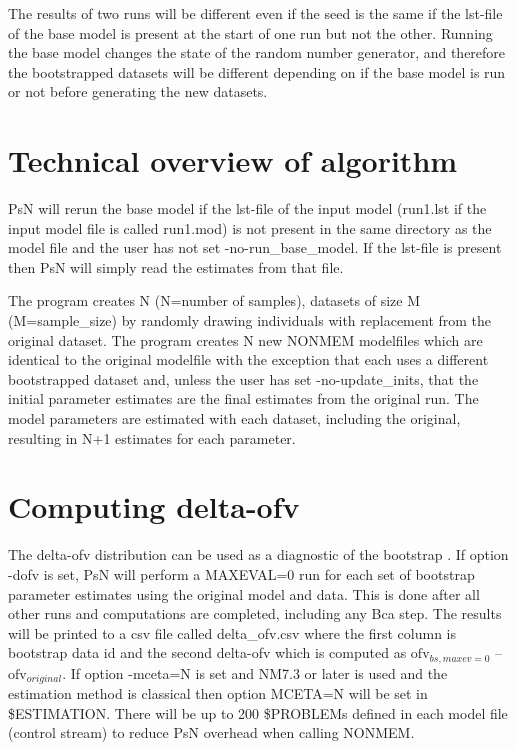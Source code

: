 The results of two runs will be different even if the seed is the same if the lst-file of the base model is present at the start of one run but not the other. Running the base model changes the state of the random number generator, and therefore the bootstrapped datasets will be different depending on if the base model is run or not before generating the  new datasets. 

\section{Technical overview of algorithm}

PsN will rerun the base model if the lst-file of the input model (run1.lst if the input model file is called run1.mod) is not present in the same directory as the model file 
and the user has not set -no-run\_base\_model. If the lst-file is present then PsN will simply read the estimates from that file.

The program creates N (N=number of samples), datasets of size M (M=sample\_size) by randomly drawing individuals with replacement from the original dataset. The program creates N new NONMEM modelfiles which are identical to the original modelfile with the exception that each uses a different  bootstrapped dataset and, 
unless the user has set -no-update\_inits,
that the initial parameter estimates are the final estimates from the original run. 
The model parameters are estimated with each dataset, including the original, resulting in N+1 estimates for each parameter.

\section{Computing delta-ofv}

The delta-ofv distribution can be used as a diagnostic of the bootstrap \cite{Niebecker}.
If option -dofv is set, PsN will perform a MAXEVAL=0 run for each set of bootstrap parameter estimates using the original model and data. This is done after all other runs and computations are completed, including any Bca step. The results will be printed to a csv file called delta\_ofv.csv where the first column is bootstrap data id and the second delta-ofv which is computed as 
$\mathrm{ofv}_{bs,maxev=0}$ – $\mathrm{ofv}_{original}$. If option -mceta=N is set and NM7.3 or later is used and the estimation method is classical then option MCETA=N will be set in \$ESTIMATION. There will be up to 200 \$PROBLEMs defined in each model file (control stream) to reduce PsN overhead when calling NONMEM.

